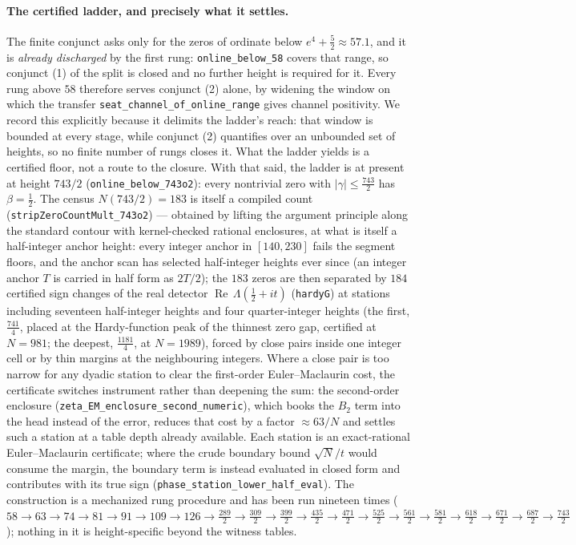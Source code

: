 \documentclass[11pt]{article}
\theoremstyle{plain}
\theoremstyle{definition}
\theoremstyle{remark}
\begin{document}
\paragraph{The certified ladder, and precisely what it settles.}
The finite conjunct asks only for the zeros of ordinate below
$e^4+\tfrac52\approx57.1$, and it is \emph{already discharged} by the first
rung: \texttt{online\_below\_58} covers that range, so conjunct (1) of the
split is closed and no further height is required for it. Every rung above
$58$ therefore serves conjunct (2) alone, by widening the window on which
the transfer \texttt{seat\_channel\_of\_online\_range} gives channel
positivity. We record this explicitly because it delimits the ladder's
reach: that window is bounded at every stage, while conjunct (2) quantifies
over an unbounded set of heights, so no finite number of rungs closes it.
What the ladder yields is a certified floor, not a route to the closure.
With that said, the ladder is at
present at height $743/2$ (\texttt{online\_below\_743o2}): every
nontrivial zero with $|\gamma|\le\tfrac{743}2$ has $\beta=\tfrac12$. The
census $N(743/2)=183$ is itself a compiled count
(\texttt{stripZeroCountMult\_743o2}) --- obtained by lifting the argument
principle along the standard contour with kernel-checked rational
enclosures, at what is itself a half-integer anchor height: every
integer anchor in $[140,230]$ fails the segment floors, and the anchor
scan has selected half-integer heights ever since (an integer anchor $T$
is carried in half form as $2T/2$); the $183$ zeros
are then separated by $184$ certified sign changes of the real detector
$\operatorname{Re}\,\Lambda(\tfrac12+it)$ (\texttt{hardyG}) at stations
including seventeen half-integer heights and four
quarter-integer heights (the first, $\tfrac{741}4$, placed at the
Hardy-function peak of the thinnest zero gap, certified at $N=981$; the
deepest, $\tfrac{1181}4$, at $N=1989$), forced by close pairs inside
one integer cell or by thin margins at the neighbouring integers.
Where a close pair is too narrow for any dyadic station to clear the
first-order Euler--Maclaurin cost, the certificate switches instrument
rather than deepening the sum: the second-order enclosure
(\texttt{zeta\_EM\_enclosure\_second\_numeric}), which books the $B_2$ term
into the head instead of the error, reduces that cost by a factor
$\approx 63/N$ and settles such a station at a table depth already
available. Each
station is an exact-rational Euler--Maclaurin certificate; where the crude
boundary bound $\sqrt N/t$ would consume the margin, the boundary term is
instead evaluated in closed form and contributes with its true sign
(\texttt{phase\_station\_lower\_half\_eval}). The construction is a
mechanized rung procedure and has been run nineteen times
($58\to63\to74\to81\to91\to109\to126\to\tfrac{289}2\to\tfrac{309}2\to\tfrac{399}2\to\tfrac{435}2\to\tfrac{471}2\to\tfrac{525}2\to\tfrac{561}2\to\tfrac{581}2\to\tfrac{618}2\to\tfrac{671}2\to\tfrac{687}2\to\tfrac{743}2$); nothing in it is
height-specific beyond the witness tables.
\end{document}
